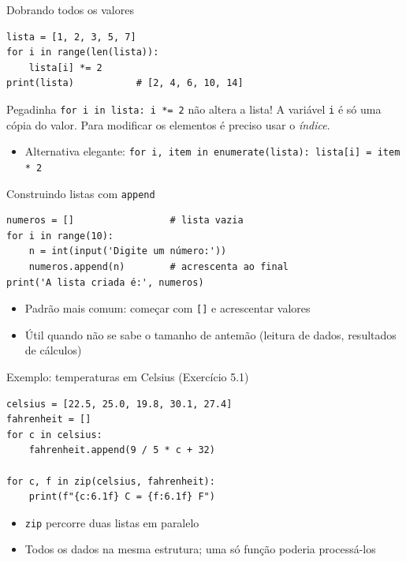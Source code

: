 \documentclass[aspectratio=169,10pt,t]{beamer}
\begin{document}
\begin{frame}[fragile]{Dobrando todos os valores}
\begin{lstlisting}
lista = [1, 2, 3, 5, 7]
for i in range(len(lista)):
    lista[i] *= 2
print(lista)           # [2, 4, 6, 10, 14]
\end{lstlisting}
  \begin{alertblock}{Pegadinha}
    \texttt{for i in lista: i *= 2} \alert{não} altera a lista! A variável \texttt{i} é só uma cópia do valor. Para modificar os elementos é preciso usar o \emph{índice}.
  \end{alertblock}
  \begin{itemize}
    \item Alternativa elegante: \texttt{for i, item in enumerate(lista): lista[i] = item * 2}
  \end{itemize}
\end{frame}

\begin{frame}[fragile]{Construindo listas com \texttt{append}}
\begin{lstlisting}
numeros = []                 # lista vazia
for i in range(10):
    n = int(input('Digite um número:'))
    numeros.append(n)        # acrescenta ao final
print('A lista criada é:', numeros)
\end{lstlisting}
  \begin{itemize}
    \item Padrão mais comum: começar com \texttt{[]} e acrescentar valores
    \item Útil quando não se sabe o tamanho de antemão (leitura de dados, resultados de cálculos)
  \end{itemize}
\end{frame}

\begin{frame}[fragile]{Exemplo: temperaturas em Celsius (Exercício 5.1)}
\begin{lstlisting}
celsius = [22.5, 25.0, 19.8, 30.1, 27.4]
fahrenheit = []
for c in celsius:
    fahrenheit.append(9 / 5 * c + 32)

for c, f in zip(celsius, fahrenheit):
    print(f"{c:6.1f} C = {f:6.1f} F")
\end{lstlisting}
  \begin{itemize}
    \item \texttt{zip} percorre duas listas em paralelo
    \item Todos os dados na mesma estrutura; uma só função poderia processá-los
  \end{itemize}
\end{frame}
\end{document}
